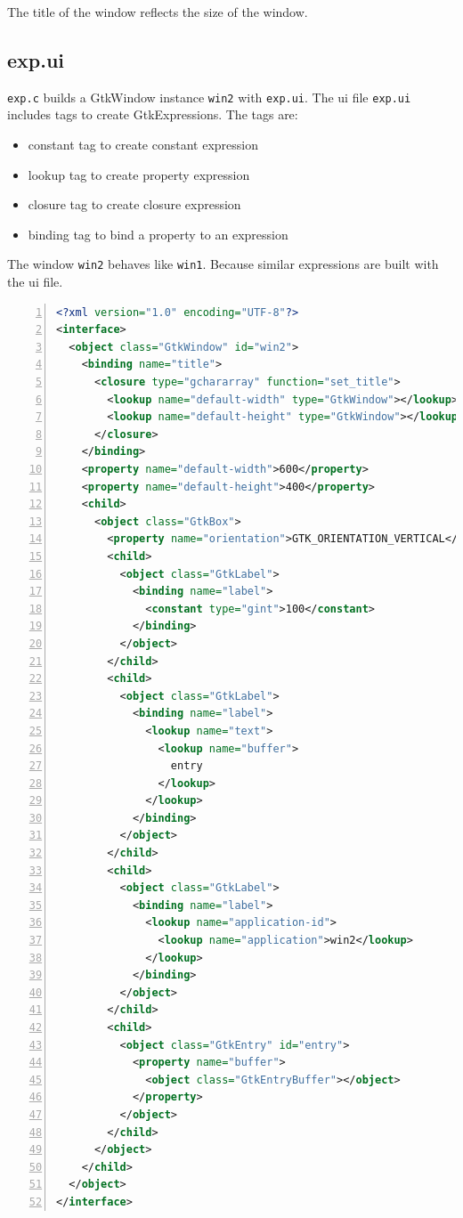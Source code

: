 The title of the window reflects the size of the window.

\hypertarget{exp.ui}{%
\subsection{exp.ui}\label{exp.ui}}

\passthrough{\lstinline!exp.c!} builds a GtkWindow instance
\passthrough{\lstinline!win2!} with \passthrough{\lstinline!exp.ui!}.
The ui file \passthrough{\lstinline!exp.ui!} includes tags to create
GtkExpressions. The tags are:

\begin{itemize}
\tightlist
\item
  constant tag to create constant expression
\item
  lookup tag to create property expression
\item
  closure tag to create closure expression
\item
  binding tag to bind a property to an expression
\end{itemize}

The window \passthrough{\lstinline!win2!} behaves like
\passthrough{\lstinline!win1!}. Because similar expressions are built
with the ui file.

\begin{lstlisting}[language=XML, numbers=left]
<?xml version="1.0" encoding="UTF-8"?>
<interface>
  <object class="GtkWindow" id="win2">
    <binding name="title">
      <closure type="gchararray" function="set_title">
        <lookup name="default-width" type="GtkWindow"></lookup>
        <lookup name="default-height" type="GtkWindow"></lookup>
      </closure>
    </binding>
    <property name="default-width">600</property>
    <property name="default-height">400</property>
    <child>
      <object class="GtkBox">
        <property name="orientation">GTK_ORIENTATION_VERTICAL</property>
        <child>
          <object class="GtkLabel">
            <binding name="label">
              <constant type="gint">100</constant>
            </binding>
          </object>
        </child>
        <child>
          <object class="GtkLabel">
            <binding name="label">
              <lookup name="text">
                <lookup name="buffer">
                  entry
                </lookup>
              </lookup>
            </binding>
          </object>
        </child>
        <child>
          <object class="GtkLabel">
            <binding name="label">
              <lookup name="application-id">
                <lookup name="application">win2</lookup>
              </lookup>
            </binding>
          </object>
        </child>
        <child>
          <object class="GtkEntry" id="entry">
            <property name="buffer">
              <object class="GtkEntryBuffer"></object>
            </property>
          </object>
        </child>
      </object>
    </child>
  </object>
</interface>
\end{lstlisting}


